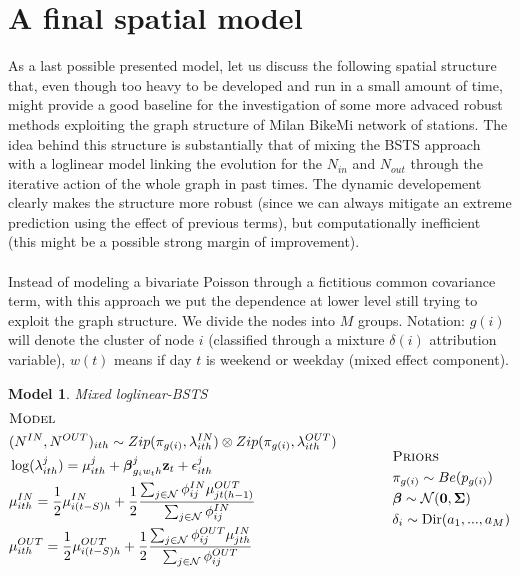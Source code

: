 \documentclass[11pt,twoside]{report}
\newtheorem{model}{Model}
\begin{document}
\section{A final spatial model}
As a last possible presented model, let us discuss the following spatial structure that, even though too heavy to be developed and run in a small amount of time, might provide a good baseline for the investigation of some more advaced robust methods exploiting the graph structure of Milan BikeMi network of stations. The idea behind this structure is substantially that of mixing the BSTS approach with a loglinear model linking the evolution for the $ N_{in} $ and $ N_{out} $ through the iterative action of the whole graph in past times. The dynamic developement clearly makes the structure more robust (since we can always mitigate an extreme prediction using the effect of previous terms), but computationally inefficient (this might be a possible strong margin of improvement).\\
\\
Instead of modeling a bivariate Poisson through a fictitious common covariance term, with this approach we put the dependence at lower level still trying to  exploit the graph structure. We divide the nodes into $M$ groups. Notation: $ g(i) $ will denote the cluster of node $ i $ (classified through a mixture $ \delta(i) $ attribution variable), $ w(t) $ means if day $ t $ is weekend or weekday (mixed effect component).

\begin{model} Mixed loglinear-BSTS\\
\begin{equation*}
\begin{aligned}
&\textsc{Model}\\
&(N^{IN}, N^{OUT})_{ith}\sim Zip(\pi_{g(i)},\lambda_{ith}^{IN})\otimes Zip(\pi_{g(i)},\lambda_{ith}^{OUT})\\
&\log(\lambda^{j}_{ith}) = \mu^{j}_{ith}+\boldsymbol{\beta}^j_{g_iw_th}\mathbf{z}_t + \epsilon_{ith}^j\\
&\mu_{ith}^{IN} = \frac{1}{2} \mu^{IN}_{i(t-S)h} + \frac{1}{2} \frac{\sum_{j \in \mathcal{N}} \phi^{IN}_{ij}\mu_{jt(h-1)}^{OUT}}{\sum_{j \in \mathcal{N}} \phi^{IN}_{ij}}\\
&\mu_{ith}^{OUT} = \frac{1}{2} \mu^{OUT}_{i(t-S)h} + \frac{1}{2} \frac{\sum_{j \in \mathcal{N}} \phi^{OUT}_{ij}\mu_{jth}^{IN}}{\sum_{j \in \mathcal{N}} \phi^{OUT}_{ij}}\\
\end{aligned}
\qquad \qquad
\begin{aligned}[c]
&\textsc{Priors}\\
&\pi_{g(i)} \sim Be(p_{g(i)})\\
&\boldsymbol{\beta} \sim \mathcal{N}(\mathbf{0},\boldsymbol{\Sigma})\\
&\mathbf{\delta}_i \sim \mathrm{Dir}(a_1,...,a_M)
\end{aligned}
\end{equation*}
\end{model}
\end{document}

